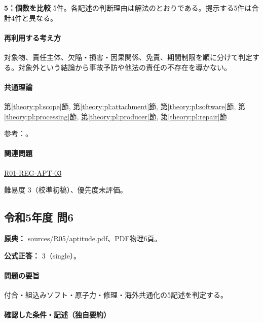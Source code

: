 \noindent\textbf{5：個数を比較} 5件。各記述の判断理由は解法のとおりである。提示する5件は合計4件と異なる。\par

\paragraph{再利用する考え方} 対象物、責任主体、欠陥・損害・因果関係、免責、期間制限を順に分けて判定する。対象外という結論から事故予防や他法の責任の不存在を導かない。

\paragraph{共通理論} \hyperref[theory:pl:scope]{第\ref*{theory:pl:scope}節}, \hyperref[theory:pl:attachment]{第\ref*{theory:pl:attachment}節}, \hyperref[theory:pl:software]{第\ref*{theory:pl:software}節}, \hyperref[theory:pl:processing]{第\ref*{theory:pl:processing}節}, \hyperref[theory:pl:producer]{第\ref*{theory:pl:producer}節}, \hyperref[theory:pl:repair]{第\ref*{theory:pl:repair}節}

\par 参考：\cite{pl_statute,pl_qa,pl_definitions2018}。

\paragraph{関連問題} \hyperref[q:r01-reg-apt-03]{R01-REG-APT-03}

\par 難易度 3（校準初稿）、優先度未評価。

\subsection{令和5年度 問6}
\label{q:r05-reg-apt-06}

\noindent\textbf{原典：} sources/R05/aptitude.pdf、PDF物理6頁。

\textbf{公式正答：} 3（single）。

\paragraph{問題の要旨} 付合・組込みソフト・原子力・修理・海外共通化の5記述を判定する。

\paragraph{確認した条件・記述（独自要約）}\mbox{}\par

